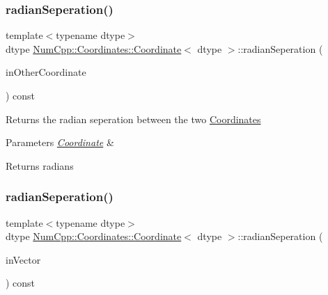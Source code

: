 \subsubsection{\texorpdfstring{radian\+Seperation()}{radianSeperation()}\hspace{0.1cm}{\footnotesize\ttfamily [1/2]}}
{\footnotesize\ttfamily template$<$typename dtype$>$ \\
dtype \mbox{\hyperlink{class_num_cpp_1_1_coordinates_1_1_coordinate}{Num\+Cpp\+::\+Coordinates\+::\+Coordinate}}$<$ dtype $>$\+::radian\+Seperation (\begin{DoxyParamCaption}\item[{const \mbox{\hyperlink{class_num_cpp_1_1_coordinates_1_1_coordinate}{Coordinate}}$<$ dtype $>$ \&}]{in\+Other\+Coordinate }\end{DoxyParamCaption}) const\hspace{0.3cm}{\ttfamily [inline]}}

Returns the radian seperation between the two \mbox{\hyperlink{namespace_num_cpp_1_1_coordinates}{Coordinates}}


\begin{DoxyParams}{Parameters}
{\em \mbox{\hyperlink{class_num_cpp_1_1_coordinates_1_1_coordinate}{Coordinate}}} & \\
\hline
\end{DoxyParams}
\begin{DoxyReturn}{Returns}
radians 
\end{DoxyReturn}
\mbox{\label{class_num_cpp_1_1_coordinates_1_1_coordinate_ac23fb1e36d5b3b090dd1188dd4ce174c}} 
\subsubsection{\texorpdfstring{radian\+Seperation()}{radianSeperation()}\hspace{0.1cm}{\footnotesize\ttfamily [2/2]}}
{\footnotesize\ttfamily template$<$typename dtype$>$ \\
dtype \mbox{\hyperlink{class_num_cpp_1_1_coordinates_1_1_coordinate}{Num\+Cpp\+::\+Coordinates\+::\+Coordinate}}$<$ dtype $>$\+::radian\+Seperation (\begin{DoxyParamCaption}\item[{const \mbox{\hyperlink{class_num_cpp_1_1_nd_array}{Nd\+Array}}$<$ dtype $>$ \&}]{in\+Vector }\end{DoxyParamCaption}) const\hspace{0.3cm}{\ttfamily [inline]}}

